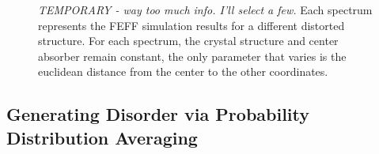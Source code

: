\begin{figure}[h]
	\centering
	\caption[FEFF Simulations Results]{\textit{TEMPORARY - way too much info. I'll select a few. }Each spectrum represents the FEFF simulation results for a different distorted structure. For each spectrum, the crystal structure and center absorber remain constant, the only parameter that varies is the euclidean distance from the center to the other coordinates.}
	\label{fig:feff-results}
\end{figure}

\subsection{Generating Disorder via Probability Distribution Averaging}

